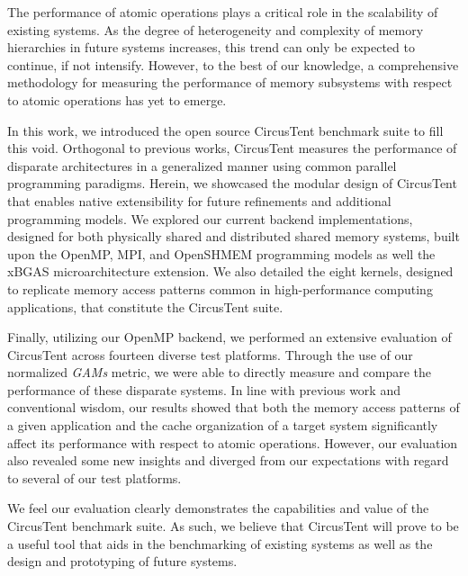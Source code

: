 
The performance of atomic operations plays a critical role in the scalability of existing systems.
As the degree of heterogeneity and complexity of memory hierarchies in future systems increases, this trend can only be expected to continue, if not intensify.
However, to the best of our knowledge, a comprehensive methodology for measuring the performance of memory subsystems with respect to atomic operations has yet to emerge.

In this work, we introduced the open source CircusTent benchmark suite to fill this void.
Orthogonal to previous works, CircusTent measures the performance of disparate architectures in a generalized manner using common parallel programming paradigms.
Herein, we showcased the modular design of CircusTent that enables native extensibility for future refinements and additional programming models.
We explored our current backend implementations, designed for both physically shared and distributed shared memory systems, built upon the OpenMP, MPI, and OpenSHMEM programming models as well the xBGAS microarchitecture extension.
We also detailed the eight kernels, designed to replicate memory access patterns common in high-performance computing applications, that constitute the CircusTent suite.

Finally, utilizing our OpenMP backend, we performed an extensive evaluation of CircusTent across fourteen diverse test platforms.
Through the use of our normalized \textit{GAMs} metric, we were able to directly measure and compare the performance of these disparate systems.
In line with previous work and conventional wisdom, our results showed that both the memory access patterns of a given application and the cache organization of a target system significantly affect its performance with respect to atomic operations.
However, our evaluation also revealed some new insights and diverged from our expectations with regard to several of our test platforms.

We feel our evaluation clearly demonstrates the capabilities and value of the CircusTent benchmark suite.
As such, we believe that CircusTent will prove to be a useful tool that aids in the benchmarking of existing systems as well as the design and prototyping of future systems.